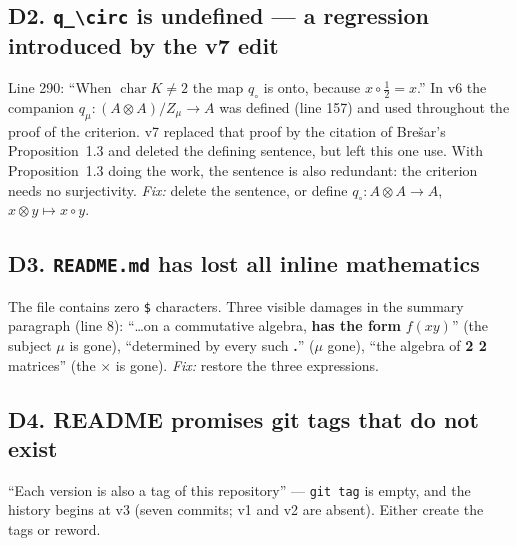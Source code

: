 \documentclass[11pt,a4paper]{article}
\newcommand{\cpt}[1]{\texttt{#1}}          %
\begin{document}
\subsection*{D2. \cpt{q\_\textbackslash circ} is undefined --- a regression introduced by the v7 edit}
Line 290: ``When $\operatorname{char}K\ne2$ the map $q_\circ$ is onto, because
$x\circ\tfrac12=x$.'' In v6 the companion $q_\mu\colon (A\otimes A)/Z_\mu\to A$ was defined (line 157)
and used throughout the proof of the criterion. v7 replaced that proof by the citation of
Bre\v{s}ar's Proposition~1.3 and deleted the defining sentence, but left this one use. With
Proposition~1.3 doing the work, the sentence is also redundant: the criterion needs no surjectivity.
\emph{Fix:} delete the sentence, or define $q_\circ\colon A\otimes A\to A$, $x\otimes y\mapsto x\circ y$.

\subsection*{D3. \cpt{README.md} has lost all inline mathematics}
The file contains zero \cpt{\$} characters. Three visible damages in the summary paragraph (line 8):
``\ldots on a commutative algebra, \textbf{has the form} $f(xy)$'' (the subject $\mu$ is gone),
``determined by every such \textbf{.}'' ($\mu$ gone), ``the algebra of \textbf{2 2} matrices'' (the
$\times$ is gone). \emph{Fix:} restore the three expressions.

\subsection*{D4. README promises git tags that do not exist}
``Each version is also a tag of this repository'' --- \cpt{git tag} is empty, and the history begins at
v3 (seven commits; v1 and v2 are absent). Either create the tags or reword.
\end{document}
